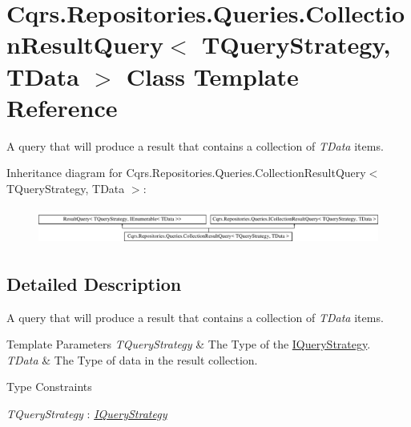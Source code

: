 \hypertarget{classCqrs_1_1Repositories_1_1Queries_1_1CollectionResultQuery}{}\section{Cqrs.\+Repositories.\+Queries.\+Collection\+Result\+Query$<$ T\+Query\+Strategy, T\+Data $>$ Class Template Reference}
\label{classCqrs_1_1Repositories_1_1Queries_1_1CollectionResultQuery}


A query that will produce a result that contains a collection of {\itshape T\+Data}  items.  


Inheritance diagram for Cqrs.\+Repositories.\+Queries.\+Collection\+Result\+Query$<$ T\+Query\+Strategy, T\+Data $>$\+:\begin{figure}[H]
\begin{center}
\leavevmode
\includegraphics[height=1.225383cm]{classCqrs_1_1Repositories_1_1Queries_1_1CollectionResultQuery}
\end{center}
\end{figure}


\subsection{Detailed Description}
A query that will produce a result that contains a collection of {\itshape T\+Data}  items. 


\begin{DoxyTemplParams}{Template Parameters}
{\em T\+Query\+Strategy} & The Type of the \hyperlink{interfaceCqrs_1_1Repositories_1_1Queries_1_1IQueryStrategy}{I\+Query\+Strategy}.\\
\hline
{\em T\+Data} & The Type of data in the result collection.\\
\hline
\end{DoxyTemplParams}
\begin{Desc}
\item[Type Constraints]\begin{description}
\item[{\em T\+Query\+Strategy} : {\em \hyperlink{interfaceCqrs_1_1Repositories_1_1Queries_1_1IQueryStrategy}{I\+Query\+Strategy}}]\end{description}
\end{Desc}
